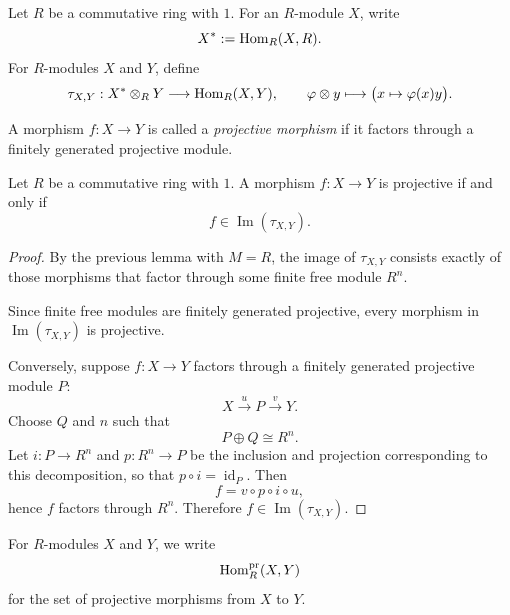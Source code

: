\begin{definition}
    Let $R$ be a commutative ring with $1$. For an $R$-module $X$, write
    \[
        X^*:=\mathrm{Hom}_R(X,R).
    \]
    For $R$-modules $X$ and $Y$, define
    \[
        \tau_{X,Y}:X^*\otimes_R Y\longrightarrow \mathrm{Hom}_R(X,Y),
        \qquad
        \varphi\otimes y \longmapsto \bigl(x\mapsto \varphi(x)y\bigr).
    \]

\end{definition}

\begin{definition}
    A morphism $f:X\to Y$ is called a \emph{projective morphism} if it factors through a
    finitely generated projective module.
\end{definition}

\begin{proposition}
    Let $R$ be a commutative ring with $1$. A morphism $f:X\to Y$ is projective if and only if
    \[
        f\in\operatorname{Im}(\tau_{X,Y}).
    \]
\end{proposition}

\begin{proof}
    By the previous lemma with $M=R$, the image of $\tau_{X,Y}$ consists exactly of those
    morphisms that factor through some finite free module $R^n$.

    Since finite free modules are finitely generated projective, every morphism in $\operatorname{Im}(\tau_{X,Y})$ is projective.

    Conversely, suppose $f:X\to Y$ factors through a finitely generated projective module $P$:
    \[
        X\xrightarrow{\,u\,} P \xrightarrow{\,v\,} Y.
    \]
    Choose $Q$ and $n$ such that
    \[
        P\oplus Q\cong R^n.
    \]
    Let $i:P\to R^n$ and $p:R^n\to P$ be the inclusion and projection corresponding to this
    decomposition, so that $p\circ i=\operatorname{id}_P$. Then
    \[
        f=v\circ p\circ i\circ u,
    \]
    hence $f$ factors through $R^n$. Therefore $f\in\operatorname{Im}(\tau_{X,Y})$.
\end{proof}

\begin{definition}
    For $R$-modules $X$ and $Y$, we write
    \[
        \mathrm{Hom}_R^{\operatorname{pr}}(X,Y)
    \]
    for the set of projective morphisms from $X$ to $Y$.
\end{definition}

